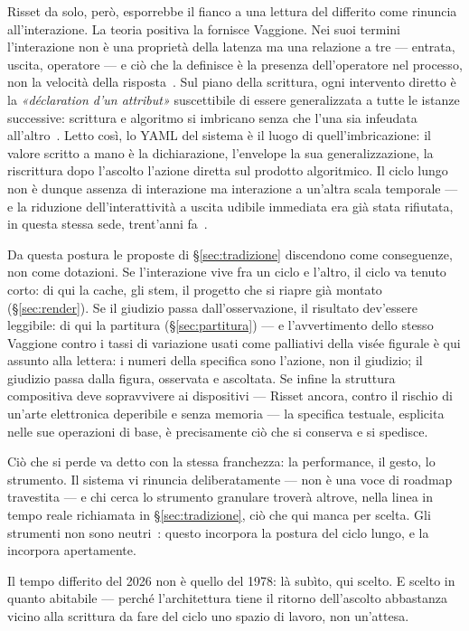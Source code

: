Risset da solo, però, esporrebbe il fianco a una lettura del differito
come rinuncia all'interazione. La teoria positiva la fornisce Vaggione.
Nei suoi termini l'interazione non è una proprietà della latenza ma una
relazione a tre --- entrata, uscita, operatore --- e ciò che la
definisce è la presenza dell'operatore nel processo, non la velocità
della risposta~\cite{Solomos2003}. Sul piano della scrittura, ogni
intervento diretto è la \emph{«déclaration d'un attribut»} suscettibile
di essere generalizzata a tutte le istanze successive: scrittura e
algoritmo si imbricano senza che l'una sia infeudata
all'altro~\cite{Vaggione1996}. Letto così, lo YAML del sistema è il
luogo di quell'imbricazione: il valore scritto a mano è la
dichiarazione, l'envelope la sua generalizzazione, la riscrittura dopo
l'ascolto l'azione diretta sul prodotto algoritmico. Il ciclo lungo non
è dunque assenza di interazione ma interazione a un'altra scala
temporale --- e la riduzione dell'interattività a uscita udibile
immediata era già stata rifiutata, in questa stessa sede, trent'anni
fa~\cite{DiScipio1995cim}.

Da questa postura le proposte di \S\ref{sec:tradizione} discendono come
conseguenze, non come dotazioni. Se l'interazione vive fra un ciclo e
l'altro, il ciclo va tenuto corto: di qui la cache, gli stem, il
progetto che si riapre già montato (\S\ref{sec:render}). Se il giudizio
passa dall'osservazione, il risultato dev'essere leggibile: di qui la
partitura (\S\ref{sec:partitura}) --- e l'avvertimento dello stesso
Vaggione contro i tassi di variazione usati come palliativi della visée
figurale è qui assunto alla lettera: i numeri della specifica sono
l'azione, non il giudizio; il giudizio passa dalla figura, osservata e
ascoltata. Se infine la struttura compositiva deve sopravvivere ai
dispositivi --- Risset ancora, contro il rischio di un'arte elettronica
deperibile e senza memoria --- la specifica testuale, esplicita nelle
sue operazioni di base, è precisamente ciò che si conserva e si spedisce.

Ciò che si perde va detto con la stessa franchezza: la performance, il
gesto, lo strumento. Il sistema vi rinuncia deliberatamente --- non è
una voce di roadmap travestita --- e chi cerca lo strumento granulare
troverà altrove, nella linea in tempo reale richiamata in
\S\ref{sec:tradizione}, ciò che qui manca per scelta. Gli strumenti non
sono neutri~\cite{Arcella2012}: questo incorpora la postura
del ciclo lungo, e la incorpora apertamente.

Il tempo differito del 2026 non è quello del 1978: là subìto, qui
scelto. E scelto in quanto abitabile --- perché l'architettura tiene il
ritorno dell'ascolto abbastanza vicino alla scrittura da fare del ciclo
uno spazio di lavoro, non un'attesa.









